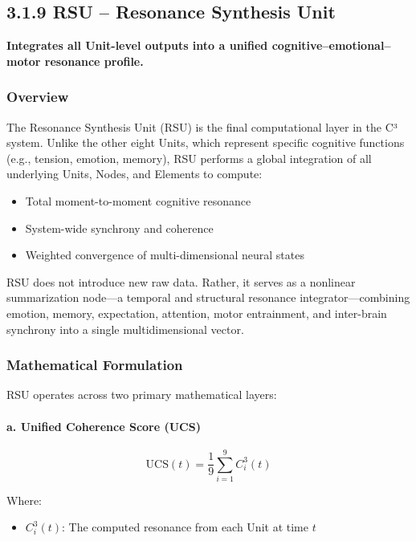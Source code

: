 \documentclass[10pt]{article}
\begin{document}
\subsection*{3.1.9 RSU – Resonance Synthesis Unit}

\textbf{Integrates all Unit-level outputs into a unified cognitive–emotional–motor resonance profile.}

\subsubsection*{Overview}

The Resonance Synthesis Unit (RSU) is the final computational layer in the C³ system. Unlike the other eight Units, which represent specific cognitive functions (e.g., tension, emotion, memory), RSU performs a global integration of all underlying Units, Nodes, and Elements to compute:

\begin{itemize}
    \item Total moment-to-moment cognitive resonance
    \item System-wide synchrony and coherence
    \item Weighted convergence of multi-dimensional neural states
\end{itemize}

RSU does not introduce new raw data. Rather, it serves as a nonlinear summarization node—a temporal and structural resonance integrator—combining emotion, memory, expectation, attention, motor entrainment, and inter-brain synchrony into a single multidimensional vector.

\subsubsection*{Mathematical Formulation}

RSU operates across two primary mathematical layers:

\paragraph{a. Unified Coherence Score (UCS)}

\[
\text{UCS}(t) = \frac{1}{9} \sum_{i=1}^{9} C^3_i(t)
\]

Where:

\begin{itemize}
    \item $C^3_i(t)$: The computed resonance from each Unit at time $t$
\end{itemize}
\end{document}
